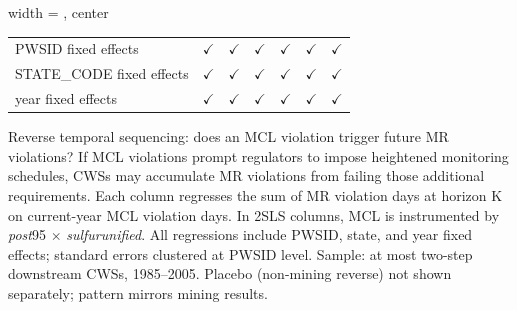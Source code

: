 \begin{table}[htbp]
\begin{adjustbox}{width = \textwidth, center}
\begin{tabular}{lcccccc}
          \\
         
         PWSID fixed effects                   & $\checkmark$    & $\checkmark$  & $\checkmark$  & $\checkmark$  & $\checkmark$  & $\checkmark$\\   
         STATE\_CODE fixed effects             & $\checkmark$    & $\checkmark$  & $\checkmark$  & $\checkmark$  & $\checkmark$  & $\checkmark$\\   
         year fixed effects                    & $\checkmark$    & $\checkmark$  & $\checkmark$  & $\checkmark$  & $\checkmark$  & $\checkmark$\\   
         
         \bottomrule
         
      \end{tabular}
      
      
      
   \end{adjustbox}
      {\tiny\linespread{1}\selectfont \par \raggedright 
   Reverse temporal sequencing: does an MCL violation trigger future MR violations? If MCL violations prompt regulators to impose heightened monitoring schedules, CWSs may accumulate MR violations from failing those additional requirements. Each column regresses the sum of MR violation days at horizon K on current-year MCL violation days. In 2SLS columns, MCL is instrumented by \textit{post}95$\,\times\,$\textit{sulfur\textunderscore unified}. All regressions include PWSID, state, and year fixed effects; standard errors clustered at PWSID level. Sample: at most two-step downstream CWSs, 1985--2005. Placebo (non-mining reverse) not shown separately; pattern mirrors mining results.}
   
\end{table}


